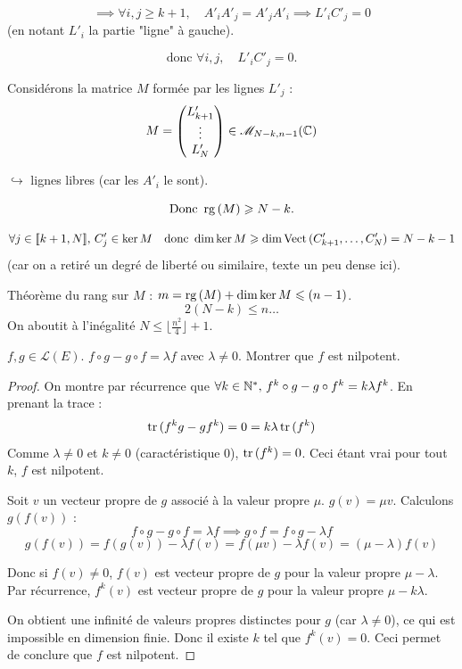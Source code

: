 \[ \implies \forall i, j \geqslant k+1, \quad A'_i A'_j = A'_j A'_i \implies L'_i C'_j = 0 \]
(en notant $L'_i$ la partie "ligne" à gauche).

\[ \text{donc } \forall i, j, \quad L'_i C'_j = 0. \]

Considérons la matrice $M$ formée par les lignes $L'_j$ :
\[ M = \begin{pmatrix} L'_{k+1} \\ \vdots \\ L'_N \end{pmatrix} \in \mathscr M_{N-k, n-1}(\mathbb{C}) \]

$\hookrightarrow$ lignes libres (car les $A'_i$ le sont).

\[ \text{Donc } \operatorname{rg} \,(M) \geqslant N-k. \]

\[ \forall j \in [\![k+1, N]\!], \, C'_j \in \ker M \quad \text{donc } \dim \ker M \geqslant \dim \operatorname{Vect} \,(C'_{k+1}, \dots, C'_N) = N-k-1 \]
(car on a retiré un degré de liberté ou similaire, texte un peu dense ici).

Théorème du rang sur $M$ : $m = \operatorname{rg} \,(M) + \dim \ker M \leqslant (n-1)$.
\[ 2(N-k) \leqslant n \dots \]
On aboutit à l'inégalité $N \leqslant \lfloor \frac{n^2}{4} \rfloor + 1$.

\lvspace
    $f, g \in \mathscr L(E)$. $f \circ g - g \circ f = \lambda f$ avec $\lambda \neq 0$.
    Montrer que $f$ est nilpotent.

\begin{proof}
    On montre par récurrence que $\forall k \in \mathbb{N}^*, \, f^k \circ g - g \circ f^k = k \lambda f^k$.
    En prenant la trace :
    \[ \operatorname{tr} \,(f^k g - g f^k) = 0 = k \lambda \operatorname{tr} \,(f^k) \]
    Comme $\lambda \neq 0$ et $k \neq 0$ (caractéristique 0), $\operatorname{tr} \,(f^k) = 0$.
    Ceci étant vrai pour tout $k$, $f$ est nilpotent.

    Soit $v$ un vecteur propre de $g$ associé à la valeur propre $\mu$.
    $g(v) = \mu v$.
    Calculons $g(f(v))$ :
    \[ f \circ g - g \circ f = \lambda f \implies g \circ f = f \circ g - \lambda f \]
    \[ g(f(v)) = f(g(v)) - \lambda f(v) = f(\mu v) - \lambda f(v) = (\mu - \lambda) f(v) \]
    
    Donc si $f(v) \neq 0$, $f(v)$ est vecteur propre de $g$ pour la valeur propre $\mu - \lambda$.
    Par récurrence, $f^k(v)$ est vecteur propre de $g$ pour la valeur propre $\mu - k \lambda$.
    
    On obtient une infinité de valeurs propres distinctes pour $g$ (car $\lambda \neq 0$), ce qui est impossible en dimension finie.
    Donc il existe $k$ tel que $f^k(v) = 0$.
    Ceci permet de conclure que $f$ est nilpotent.
\end{proof}
